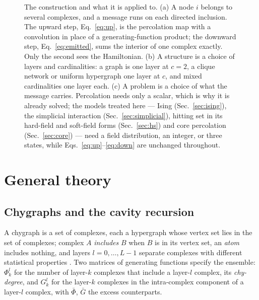 \documentclass[aps,pre,twocolumn,superscriptaddress,floatfix]{revtex4-2}
\begin{document}
\begin{figure}[t]
\begin{tikzpicture}[yscale=1.0]
\end{tikzpicture}
\caption{\label{fig:schematic}The construction and what it is applied to.
(a) A node $i$ belongs to several complexes, and a message runs on each directed
inclusion. The upward step, Eq.~\eqref{eq:up}, is the percolation map with a
convolution in place of a generating-function product; the downward step,
Eq.~\eqref{eq:emitted}, sums the interior of one complex exactly. Only the
second sees the Hamiltonian.
(b) A structure is a choice of layers and cardinalities: a graph is one layer at
$c=2$, a clique network or uniform hypergraph one layer at $c$, and mixed
cardinalities one layer each.
(c) A problem is a choice of what the message carries. Percolation needs only a
scalar, which is why it is already solved; the models treated here --- Ising
(Sec.~\ref{sec:ising}), the simplicial interaction
(Sec.~\ref{sec:simplicial}), hitting set in its hard-field and soft-field forms
(Sec.~\ref{sec:hs}) and core percolation (Sec.~\ref{sec:core}) --- need a field
distribution, an integer, or three states, while
Eqs.~\eqref{eq:up}--\eqref{eq:down} are unchanged throughout.}
\end{figure}

\section{General theory}
\label{sec:theory}

\subsection{Chygraphs and the cavity recursion}

A chygraph is a set of complexes, each a hypergraph whose vertex set lies in the
set of complexes; complex $A$ \emph{includes} $B$ when $B$ is in its vertex set,
an \emph{atom} includes nothing, and layers $l=0,\dots,L-1$ separate complexes
with different statistical properties \cite{vazquez2023pre}. Two matrices of
generating functions specify the ensemble: $\Phi^l_k$ for the number of layer-$k$
complexes that include a layer-$l$ complex, its \emph{chy-degree}, and $G^l_k$
for the layer-$k$ complexes in the intra-complex component of a layer-$l$
complex, with $\bar\Phi$, $\bar G$ the excess counterparts.
\end{document}
